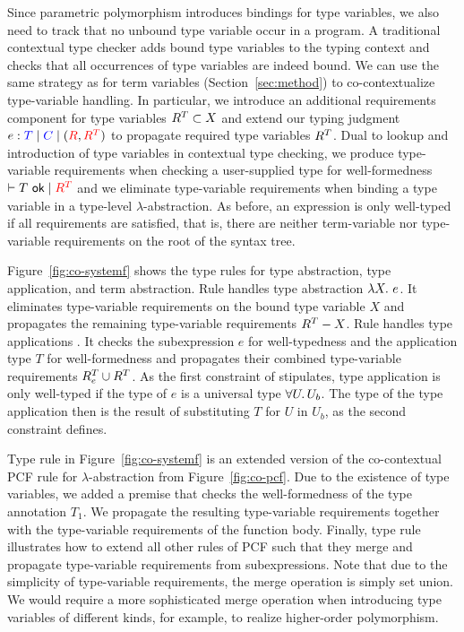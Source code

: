 Since parametric polymorphism introduces bindings for type variables, we also
need to track that no unbound type variable occur in a program. A traditional
contextual type checker adds bound type variables to the typing context and
checks that all occurrences of type variables are indeed bound. We can use the
same strategy as for term variables (Section~\ref{sec:method}) to
co-contextualize type-variable handling. In particular, we introduce an
additional requirements component for type variables $R^T \subset X$ and
extend our typing judgment $\cojudgePol {e} {T} {C} {\reqs} {\treqs}$ to
propagate required type variables $R^T$. Dual to lookup and introduction of
type variables in contextual type checking, we produce type-variable
requirements when checking a user-supplied type for well-formedness
$\coTypeOK{T}{\treqs}$ and we eliminate type-variable requirements when binding
a type variable in a type-level $\lambda$-abstraction. As before, an expression
is only well-typed if all requirements are satisfied, that is, there are neither
term-variable nor type-variable requirements on the root of the syntax tree.



Figure~\ref{fig:co-systemf} shows the type rules for type abstraction, type
application, and term abstraction. %
Rule  handles type abstraction $\lambda X.\ e$. It eliminates
type-variable requirements on the bound type variable $X$ and propagates the
remaining type-variable requirements $R^T - X$. %
Rule  handles type applications . It checks the
subexpression $e$ for well-typedness and the application type $T$ for
well-formedness and propagates their combined type-variable requirements
$R^T_e \cup R^T$. As the first constraint of  stipulates,
type application is only well-typed if the type of $e$ is a universal type
$\forall U.\,U_b$. The type of the type application then is the result of
substituting $T$ for $U$ in $U_b$, as the second constraint defines.

Type rule  in Figure~\ref{fig:co-systemf} is an extended version
of the co-contextual PCF rule for $\lambda$-abstraction from
Figure~\ref{fig:co-pcf}. Due to the existence of type variables, we added a
premise that checks the well-formedness of the type annotation $T_1$. We
propagate the resulting type-variable requirements together with the
type-variable requirements of the function body. Finally, type rule
 illustrates how to extend all other rules of PCF such that they
merge and propagate type-variable requirements from subexpressions. Note that
due to the simplicity of type-variable requirements, the merge operation is
simply set union. We would require a more sophisticated merge operation when
introducing type variables of different kinds, for example, to realize
higher-order polymorphism.

